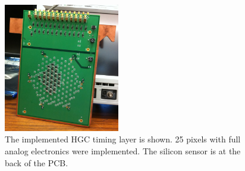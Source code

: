 \begin{figure}[h] 
\centering
\includegraphics[width=0.45\textwidth]{HGC/silicon_layer.png} 
\caption{The implemented HGC timing layer is shown. 25 pixels with
  full analog electronics were implemented. The silicon sensor is at the back
  of the PCB.} 
\label{hgc:pcb} 
\end{figure} 

